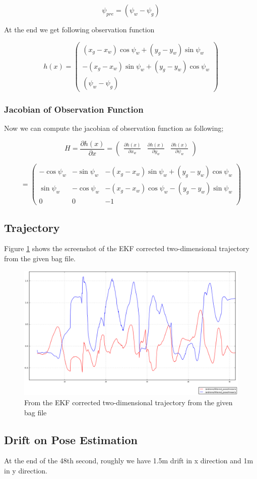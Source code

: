\documentclass[14pt,a4paper]{article}
\begin{document}
		\[ \psi_{pre}=(\psi_{w} - \psi_{g})\]
		
		At the end we get following observation function
		
		$$
		h(x)	= \begin{pmatrix}
					(x_{g} - x_{w})\cos\psi_{w}	 +	(y_{g}-y_{w})\sin\psi_{w}\\ 	
					-(x_{g} - x_{w})\sin\psi_{w} +	(y_{g}-y_{w})\cos\psi_{w}\\
											(\psi_{w} - \psi_{g})
			\end{pmatrix}
		$$
		
		\subsubsection{Jacobian of Observation Function}
		
			Now we can  compute the jacobian of observation function as following;
		
		$$
			H = \frac{\partial h(x)}{\partial x}
			  = \begin{pmatrix}
			  \frac{\partial h(x)}{\partial x_{w}} &
			  \frac{\partial h(x)}{\partial y_{w}} &
			  \frac{\partial h(x)}{\partial \psi_{w}}  			
			  \end{pmatrix}
		$$
		
		$$
			  = 
			  \begin{pmatrix}
					-\cos\psi_{w} & -\sin\psi_{w} & -(x_{g} - x_{w})\sin\psi_{w} +	(y_{g}-y_{w})\cos\psi_{w}\\  	
					\sin\psi_{w}  &	-\cos\psi_{w} & -(x_{g	} - x_{w})\cos\psi_{w} -	(y_{g}-y_{w})\sin\psi_{w}\\
											0 & 0 & -1
			\end{pmatrix}
		$$
	\subsection{Trajectory}
		Figure \ref{graph:filtered_pose_corrected} shows the screenshot of the EKF corrected two-dimensional trajectory from the given bag file.
	
	\begin{figure}[htbp]
	\centering
	\includegraphics[scale=0.4]{filtered_pose_corrected.png}
  	\caption{From the EKF corrected two-dimensional trajectory from the given bag file}
    \label{graph:filtered_pose_corrected}
	\end{figure}
		
	
	\subsection{Drift on Pose Estimation}
	
	At the end of the 48th second, roughly we have 1.5m drift in x direction and 1m in y direction.
\end{document}
